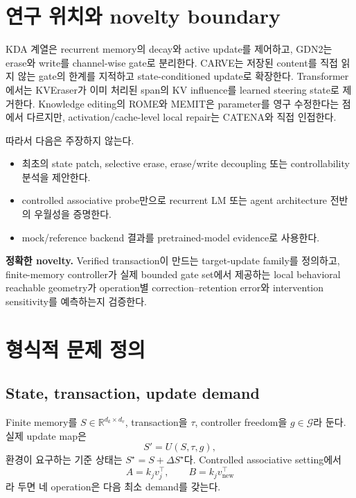 \documentclass[10.5pt,a4paper]{article}
\newcommand{\R}{\mathbb{R}}
\begin{document}
\tableofcontents
\newpage

\section{연구 위치와 novelty boundary}
KDA 계열은 recurrent memory의 decay와 active update를 제어하고, GDN2는 erase와 write를 channel-wise gate로 분리한다\citep{kimilinear2025,gdn22026}. CARVE는 저장된 content를 직접 읽지 않는 gate의 한계를 지적하고 state-conditioned update로 확장한다\citep{carve2026}. Transformer에서는 KVEraser가 이미 처리된 span의 KV influence를 learned steering state로 제거한다\citep{kveraser2026}. Knowledge editing의 ROME와 MEMIT은 parameter를 영구 수정한다는 점에서 다르지만\citep{rome2022,memit2022}, activation/cache-level local repair는 CATENA와 직접 인접한다.

따라서 다음은 주장하지 않는다.
\begin{itemize}
\item 최초의 state patch, selective erase, erase/write decoupling 또는 controllability 분석을 제안한다.
\item controlled associative probe만으로 recurrent LM 또는 agent architecture 전반의 우월성을 증명한다.
\item mock/reference backend 결과를 pretrained-model evidence로 사용한다.
\end{itemize}

\begin{claimbox}
\textbf{정확한 novelty.} Verified transaction이 만드는 target-update family를 정의하고, finite-memory controller가 실제 bounded gate set에서 제공하는 local behavioral reachable geometry가 operation별 correction--retention error와 intervention sensitivity를 예측하는지 검증한다.
\end{claimbox}

\section{형식적 문제 정의}
\subsection{State, transaction, update demand}
Finite memory를 $S\in\R^{d_k\times d_v}$, transaction을 $\tau$, controller freedom을 $g\in\mathcal G$라 둔다. 실제 update map은
\[
S'=U(S,\tau,g),
\]
환경이 요구하는 기준 상태는 $S^\star=S+\Delta S^\star$다. Controlled associative setting에서
\[
A=k_jv_j^\top,\qquad B=k_jv_{\mathrm{new}}^\top
\]
라 두면 네 operation은 다음 최소 demand를 갖는다.
\end{document}
